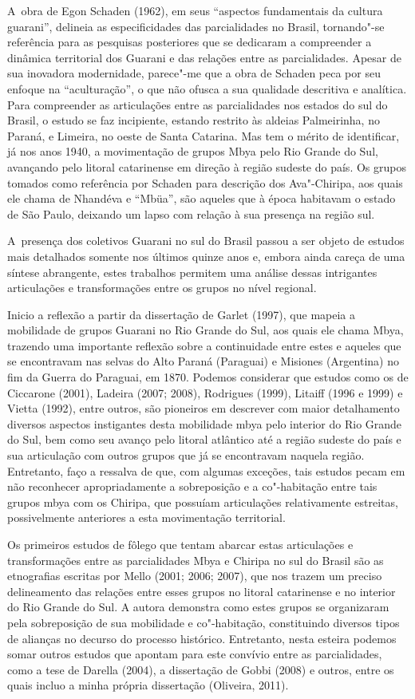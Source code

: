 A~obra de Egon Schaden (1962), em seus ``aspectos fundamentais
da cultura guarani'', delineia as especificidades das parcialidades no
Brasil, tornando"-se referência para as pesquisas posteriores que se
dedicaram a compreender a dinâmica territorial dos Guarani e das
relações entre as parcialidades. Apesar de sua inovadora modernidade,
parece"-me que a obra de Schaden peca por seu enfoque na ``aculturação'',
o que não ofusca a sua qualidade descritiva e analítica. Para compreender as articulações entre as
parcialidades nos estados do sul do Brasil, o estudo se faz incipiente,
estando restrito às aldeias Palmeirinha, no Paraná, e Limeira, no oeste
de Santa Catarina. Mas tem o mérito de identificar, já nos anos 1940, a
movimentação de grupos Mbya pelo Rio Grande do Sul, avançando pelo
litoral catarinense em direção à região sudeste do país. Os grupos
tomados como referência por Schaden para descrição dos Ava"-Chiripa, aos
quais ele chama de Nhandéva e ``Mbüa'', são aqueles que à época
habitavam o estado de São Paulo, deixando um lapso com relação à sua
presença na região sul.

A~presença dos coletivos Guarani no sul do Brasil passou a ser objeto de
estudos mais detalhados somente nos últimos quinze anos e, embora ainda
careça de uma síntese abrangente, estes trabalhos permitem uma análise
dessas intrigantes articulações e transformações entre os grupos no
nível regional. 

Inicio a reflexão a partir da dissertação de Garlet (1997), que
mapeia a mobilidade de grupos Guarani no Rio Grande do Sul, aos quais
ele chama Mbya, trazendo uma importante reflexão sobre a continuidade
entre estes e aqueles que se encontravam nas selvas do Alto Paraná
(Paraguai) e Misiones (Argentina) no fim da Guerra do Paraguai, em
1870. Podemos considerar que estudos como os de Ciccarone
(2001), Ladeira (2007; 2008), Rodrigues (1999),
Litaiff (1996 e 1999) e Vietta (1992), entre outros, são
pioneiros em descrever com maior detalhamento diversos aspectos
instigantes desta mobilidade mbya pelo interior do Rio Grande do Sul,
bem como seu avanço pelo litoral atlântico até a região sudeste do país
e sua articulação com outros grupos que já se encontravam naquela
região. Entretanto, faço a ressalva de que, com algumas exceções, tais
estudos pecam em não reconhecer apropriadamente a sobreposição e a
co"-habitação entre tais grupos mbya com os Chiripa, que possuíam
articulações relativamente estreitas, possivelmente anteriores a esta
movimentação territorial.

Os primeiros estudos de fôlego que tentam abarcar estas articulações e
transformações entre as parcialidades Mbya e Chiripa no sul do Brasil
são as etnografias escritas por Mello (2001; 2006;
2007), que nos trazem um preciso delineamento das relações entre esses
grupos no litoral catarinense e no interior do Rio Grande do Sul. A
autora demonstra como estes grupos se organizaram pela
sobreposição de sua mobilidade e co"-habitação, constituindo diversos
tipos de alianças no decurso do processo histórico. Entretanto, nesta
esteira podemos somar outros estudos que apontam para este convívio
entre as parcialidades, como a tese de Darella (2004), a
dissertação de Gobbi (2008) e outros, entre os quais incluo a
minha própria dissertação (Oliveira, 2011). 

